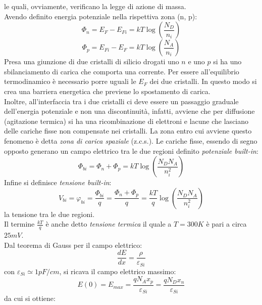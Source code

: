 \documentclass{article}
\begin{document}
le quali, ovviamente, verificano la legge di azione di massa.\\
Avendo definito energia potenziale nella rispettiva zona (n, p):
\begin{equation*}
\Phi_n = E_F-E_{Fi} = kT \log \left( \frac{N_D}{n_i} \right)
\end{equation*}
\begin{equation*}
\Phi_p = E_{Fi}-E_F = kT \log \left(\frac{N_A}{n_i}\right)
\end{equation*}
Presa una giunzione di due cristalli di silicio drogati uno $n$ e uno $p$ si ha uno sbilanciamento di carica che comporta una corrente. Per essere all'equilibrio termodinamico è necessario porre uguali le $E_F$ dei due cristalli. In questo modo si crea una barriera energetica che previene lo spostamento di carica.\\
Inoltre, all'interfaccia tra i due cristalli ci deve essere un passaggio graduale dell'energia potenziale e non una discontinuità, infatti, avviene che per diffusione (agitazione termica) si ha una ricombinazione di elettroni e lacune che lasciano delle cariche fisse non compensate nei cristalli. La zona entro cui avviene questo fenomeno è detta \textit{zona di carica spaziale} (z.c.s.). Le cariche fisse, essendo di segno opposto generano un campo elettrico tra le due regioni definito \textit{potenziale built-in}:
\begin{equation*}
\Phi_{bi} = \Phi_n + \Phi_p = kT \log \left(\frac{N_DN_A}{n_i^2}\right)
\end{equation*}
Infine si definisce \textit{tensione built-in}:
\begin{equation*}
V_{bi} = \varphi_{bi} = \frac{\Phi_{bi}}{q} = \frac{\Phi_n + \Phi_p}{q} = \frac{kT}{q} \log \left(\frac{N_DN_A}{n_i^2}\right)
\end{equation*}
la tensione tra le due regioni.\\
Il termine $\frac{kT}{q}$ è anche detto \textit{tensione termica} il quale a $T=300K$ è pari a circa $25mV$.\\
Dal teorema di Gauss per il campo elettrico:
\begin{equation*}
\frac{dE}{dx} = \frac{\rho}{\varepsilon_{Si}}
\end{equation*}
con $\varepsilon_{Si} \simeq 1 pF/cm$, si ricava il campo elettrico massimo:
\begin{equation} \label{eq:e_max}
E(0) = E_{max} = \frac{qN_Ax_p}{\varepsilon_{Si}} = \frac{qN_Dx_n}{\varepsilon_{Si}}
\end{equation}
da cui si ottiene:
\end{document}
